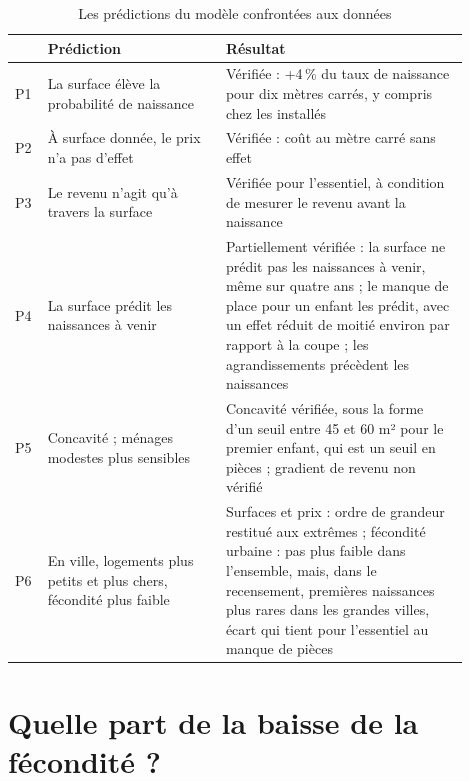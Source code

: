 \documentclass[11pt,a4paper]{article}
\theoremstyle{plain}
\theoremstyle{definition}
\theoremstyle{remark}
\begin{document}
\begin{table}[htbp]
\centering\small
\begin{threeparttable}
\caption{Les prédictions du modèle confrontées aux données}\label{tab:bilan}
\begin{tabular}{@{}p{0.05\linewidth}p{0.36\linewidth}p{0.49\linewidth}@{}}
\toprule
& Prédiction & Résultat \\
\midrule
P1 & La surface élève la probabilité de naissance & Vérifiée : +4\,\% du taux de naissance pour dix mètres carrés, y compris chez les installés \\
P2 & À surface donnée, le prix n'a pas d'effet & Vérifiée : coût au mètre carré sans effet \\
P3 & Le revenu n'agit qu'à travers la surface & Vérifiée pour l'essentiel, à condition de mesurer le revenu avant la naissance \\
P4 & La surface prédit les naissances à venir & Partiellement vérifiée : la surface ne prédit pas les naissances à venir, même sur quatre ans ; le manque de place pour un enfant les prédit, avec un effet réduit de moitié environ par rapport à la coupe ; les agrandissements précèdent les naissances \\
P5 & Concavité ; ménages modestes plus sensibles & Concavité vérifiée, sous la forme d'un seuil entre 45 et 60 m² pour le premier enfant, qui est un seuil en pièces ; gradient de revenu non vérifié \\
P6 & En ville, logements plus petits et plus chers, fécondité plus faible & Surfaces et prix : ordre de grandeur restitué aux extrêmes ; fécondité urbaine : pas plus faible dans l'ensemble, mais, dans le recensement, premières naissances plus rares dans les grandes villes, écart qui tient pour l'essentiel au manque de pièces \\
\bottomrule
\end{tabular}
\end{threeparttable}
\end{table}

\section{Quelle part de la baisse de la fécondité ?}\label{sec:decompo}
\end{document}
